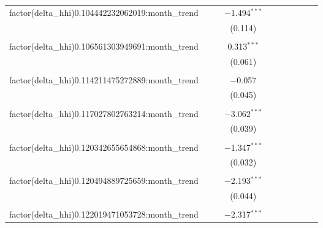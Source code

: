 \begin{table}[H]
{\begin{tabular}{@{\extracolsep{5pt}}lccccccccc}
  factor(delta\_hhi)0.104442232062019:month\_trend &  &  & $-$1.494$^{***}$ &  &  &  &  &  &  \\  

   &  &  & (0.114) &  &  &  &  &  &  \\  

   & & & & & & & & & \\  

  factor(delta\_hhi)0.106561303949691:month\_trend &  &  & 0.313$^{***}$ &  &  &  &  &  &  \\  

   &  &  & (0.061) &  &  &  &  &  &  \\  

   & & & & & & & & & \\  

  factor(delta\_hhi)0.114211475272889:month\_trend &  &  & $-$0.057 &  &  &  &  &  &  \\  

   &  &  & (0.045) &  &  &  &  &  &  \\  

   & & & & & & & & & \\  

  factor(delta\_hhi)0.117027802763214:month\_trend &  &  & $-$3.062$^{***}$ &  &  &  &  &  &  \\  

   &  &  & (0.039) &  &  &  &  &  &  \\  

   & & & & & & & & & \\  

  factor(delta\_hhi)0.120342655654868:month\_trend &  &  & $-$1.347$^{***}$ &  &  &  &  &  &  \\  

   &  &  & (0.032) &  &  &  &  &  &  \\  

   & & & & & & & & & \\  

  factor(delta\_hhi)0.120494889725659:month\_trend &  &  & $-$2.193$^{***}$ &  &  &  &  &  &  \\  

   &  &  & (0.044) &  &  &  &  &  &  \\  

   & & & & & & & & & \\  

  factor(delta\_hhi)0.122019471053728:month\_trend &  &  & $-$2.317$^{***}$ &  &  &  &  &  &  \\  


\end{tabular}}
\end{table}
